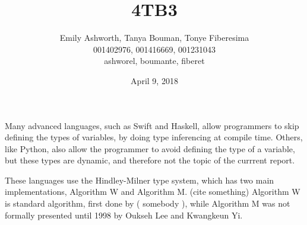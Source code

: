 \documentclass[12pt]{article}
\title{4TB3 }
\author{Emily Ashworth, Tanya Bouman, Tonye Fiberesima \\ 
001402976, 001416669, 001231043 \\ 
ashworel, boumante, fiberet}
\date{April 9, 2018}
\begin{document}
\maketitle

Many advanced languages, such as Swift\cite{swifttypedocs} and Haskell\cite{haskelltypedocs},
allow programmers to skip defining the types of variables,
by doing type inferencing at compile time.
Others, like Python, also allow the programmer to avoid defining
the type of a variable, but these types are dynamic\cite{pythonsummary}, 
and therefore not the topic of the currrent report.

These languages use the Hindley-Milner type system, which has two main implementations, Algorithm W and Algorithm M.  (cite something)  Algorithm W is standard algorithm, first done by ( somebody ), while Algorithm M was not formally presented until 1998 by Oukseh Lee and Kwangkeun Yi\cite{Lee:1998:PFL:291891.291892}.











\end{document}
